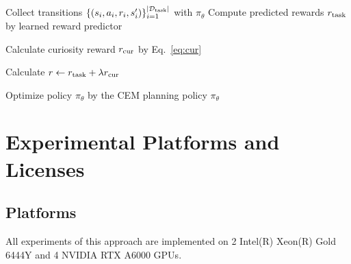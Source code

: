 \begin{algorithm}[h]
\begin{algorithmic}[]
      \begin{tcolorbox}[colback=purple!10!white,colframe=purple!50!black,title=Step 3: Policy Learning]
     
     \STATE Collect transitions $\{(s_{i},a_{i}, r_i, s'_{i})\}_{i=1}^{|\mathcal{D}_{\rm{task}}|}$ with $\pi_{\theta}$  
     \STATE Compute predicted rewards $r_{\rm{task}}$ by learned reward predictor
     
     \STATE Calculate curiosity reward $r_{\rm{cur}}$ by Eq.~\ref{eq:cur}

     \STATE Calculate $r \gets r_{\rm{task}} + \lambda r_{\rm{cur}}$
     
     \STATE Optimize policy $\pi_{\theta}$ by the CEM planning
     \ENDFOR
     \RETURN policy $\pi_{\theta}$
     \end{tcolorbox}

    \end{algorithmic}
\end{algorithm}



\section{Experimental Platforms and Licenses}
\label{exp}
\subsection{Platforms}
All experiments of this approach are implemented on 2 Intel(R) Xeon(R) Gold 6444Y and 4 NVIDIA RTX A6000 GPUs.

